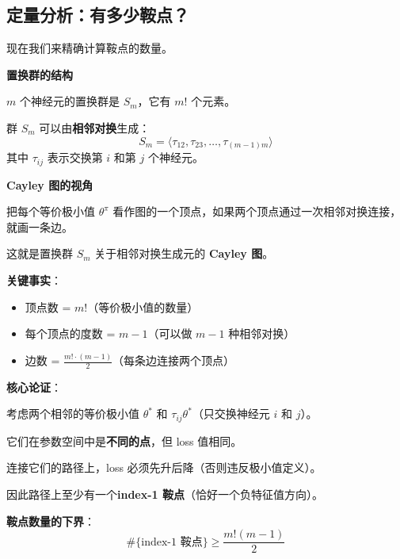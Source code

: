 \documentclass[12pt, a4paper]{ctexart}
\begin{document}
\subsection{定量分析：有多少鞍点？}

现在我们来精确计算鞍点的数量。

\begin{blackboard}[从对称群到鞍点计数]

\textbf{置换群的结构}

$m$ 个神经元的置换群是 $S_m$，它有 $m!$ 个元素。

群 $S_m$ 可以由\textbf{相邻对换}生成：
\[
S_m = \langle \tau_{12}, \tau_{23}, \ldots, \tau_{(m-1)m} \rangle
\]
其中 $\tau_{ij}$ 表示交换第 $i$ 和第 $j$ 个神经元。

\textbf{Cayley 图的视角}

把每个等价极小值 $\theta^\pi$ 看作图的一个顶点，如果两个顶点通过一次相邻对换连接，就画一条边。

这就是置换群 $S_m$ 关于相邻对换生成元的 \textbf{Cayley 图}。

\textbf{关键事实}：
\begin{itemize}
    \item 顶点数 = $m!$（等价极小值的数量）
    \item 每个顶点的度数 = $m-1$（可以做 $m-1$ 种相邻对换）
    \item 边数 = $\frac{m! \cdot (m-1)}{2}$（每条边连接两个顶点）
\end{itemize}

\end{blackboard}

\begin{blackboard}[每条边对应一个鞍点]

\textbf{核心论证}：

考虑两个相邻的等价极小值 $\theta^*$ 和 $\tau_{ij}\theta^*$（只交换神经元 $i$ 和 $j$）。

它们在参数空间中是\textbf{不同的点}，但 loss 值相同。

连接它们的路径上，loss 必须先升后降（否则违反极小值定义）。

因此路径上至少有一个\textbf{index-1 鞍点}（恰好一个负特征值方向）。

\textbf{鞍点数量的下界}：
\[
\#\{\text{index-1 鞍点}\} \geq \frac{m!(m-1)}{2}
\]

\end{blackboard}
\end{document}
